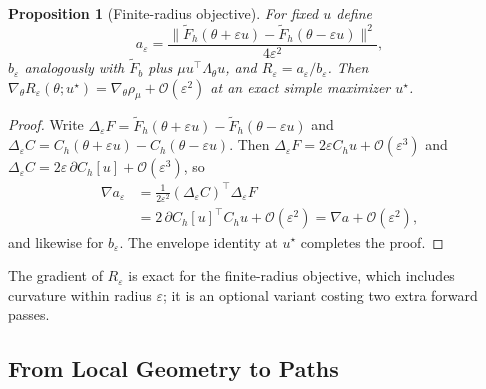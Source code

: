 \documentclass[11pt]{article}
\newtheorem{proposition}{Proposition}
\newcommand{\rhoreg}{\rho_{\mu}}
\newcommand{\Lam}{\Lambda_{\theta}}
\newcommand{\Ft}{\widetilde{F}}
\newcommand{\Ch}{C_{h}}
\begin{document}
\begin{proposition}[Finite-radius objective]
\label{prop:finite}
For fixed $u$ define
\begin{equation*}
a_\varepsilon=\frac{\|\Ft_h(\theta+\varepsilon u)-\Ft_h(\theta-\varepsilon u)\|^2}{4\varepsilon^2},
\end{equation*}
$b_\varepsilon$ analogously with $\Ft_b$ plus $\mu u^\top\Lam u$, and $R_\varepsilon=a_\varepsilon/b_\varepsilon$. Then $\nabla_\theta R_\varepsilon(\theta;u^\star)=\nabla_\theta\rhoreg+\mathcal O(\varepsilon^2)$ at an exact simple maximizer $u^\star$.
\end{proposition}
\begin{proof}
Write $\Delta_\varepsilon F=\Ft_h(\theta+\varepsilon u)-\Ft_h(\theta-\varepsilon u)$ and $\Delta_\varepsilon C=\Ch(\theta+\varepsilon u)-\Ch(\theta-\varepsilon u)$. Then $\Delta_\varepsilon F=2\varepsilon\Ch u+\mathcal O(\varepsilon^3)$ and $\Delta_\varepsilon C=2\varepsilon\,\partial\Ch[u]+\mathcal O(\varepsilon^3)$, so
\begin{equation*}
\begin{aligned}
\nabla a_\varepsilon&=\tfrac{1}{2\varepsilon^2}(\Delta_\varepsilon C)^\top\Delta_\varepsilon F\\
&=2\,\partial\Ch[u]^\top\Ch u+\mathcal O(\varepsilon^2)=\nabla a+\mathcal O(\varepsilon^2),
\end{aligned}
\end{equation*}
and likewise for $b_\varepsilon$. The envelope identity at $u^\star$ completes the proof.
\end{proof}
The gradient of $R_\varepsilon$ is exact for the finite-radius objective, which includes curvature within radius $\varepsilon$; it is an optional variant costing two extra forward passes.

\subsection{From Local Geometry to Paths}
\label{app:path}
\end{document}
